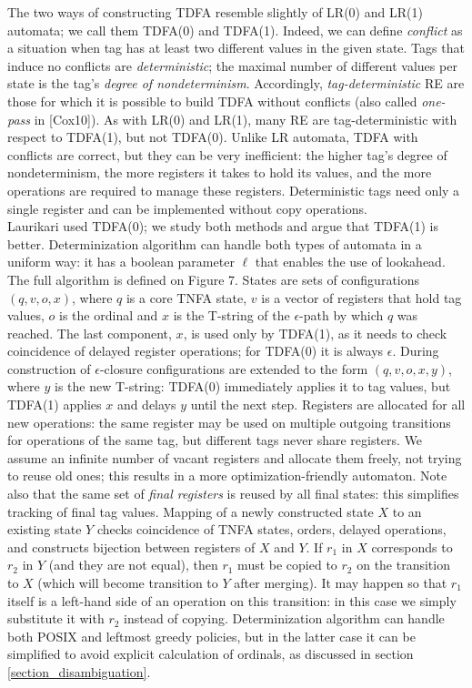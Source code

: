 \documentclass{article}
\theoremstyle{definition}
\begin{document}
\begin{multicols}{2}
The two ways of constructing TDFA resemble slightly of LR(0) and LR(1) automata; we call them TDFA(0) and TDFA(1).
Indeed, we can define \emph{conflict} as a situation when tag has at least two different values in the given state.
Tags that induce no conflicts are \emph{deterministic};
the maximal number of different values per state is the tag's \emph{degree of nondeterminism}.
Accordingly, \emph{tag-deterministic} RE are those for which it is possible to build TDFA without conflicts
(also called \emph{one-pass} in [Cox10]).
As with LR(0) and LR(1), many RE are tag-deterministic with respect to TDFA(1), but not TDFA(0).
Unlike LR automata, TDFA with conflicts are correct, but they can be very inefficient:
the higher tag's degree of nondeterminism, the more registers it takes to hold its values,
and the more operations are required to manage these registers.
Deterministic tags need only a single register and can be implemented without copy operations.
\\

Laurikari used TDFA(0); we study both methods and argue that TDFA(1) is better.
Determinization algorithm can handle both types of automata in a uniform way:
it has a boolean parameter $\ell$ that enables the use of lookahead.
The full algorithm is defined on Figure 7.
States are sets of configurations $(q, v, o, x)$,
where $q$ is a core TNFA state, $v$ is a vector of registers that hold tag values, $o$ is the ordinal
and $x$ is the T-string of the $\epsilon$-path by which $q$ was reached.
The last component, $x$, is used only by TDFA(1), as it needs to check coincidence of delayed register operations;
for TDFA(0) it is always $\epsilon$.
During construction of $\epsilon$-closure configurations are extended to the form $(q, v, o, x, y)$,
where $y$ is the new T-string: TDFA(0) immediately applies it to tag values,
but TDFA(1) applies $x$ and delays $y$ until the next step.
Registers are allocated for all new operations:
the same register may be used on multiple outgoing transitions for operations of the same tag,
but different tags never share registers.
We assume an infinite number of vacant registers and allocate them freely, not trying to reuse old ones;
this results in a more optimization-friendly automaton.
Note also that the same set of \emph{final registers} is reused by all final states:
this simplifies tracking of final tag values.
Mapping of a newly constructed state $X$ to an existing state $Y$ checks coincidence of TNFA states, orders, delayed operations,
and constructs bijection between registers of $X$ and $Y$.
If $r_1$ in $X$ corresponds to $r_2$ in $Y$ (and they are not equal), then $r_1$ must be copied to $r_2$ on the transition to $X$
(which will become transition to $Y$ after merging).
It may happen so that $r_1$ itself is a left-hand side of an operation on this transition:
in this case we simply substitute it with $r_2$ instead of copying.
Determinization algorithm can handle both POSIX and leftmost greedy policies,
but in the latter case it can be simplified to avoid explicit calculation of ordinals, as discussed in section \ref{section_disambiguation}.


\end{multicols}
\end{document}
